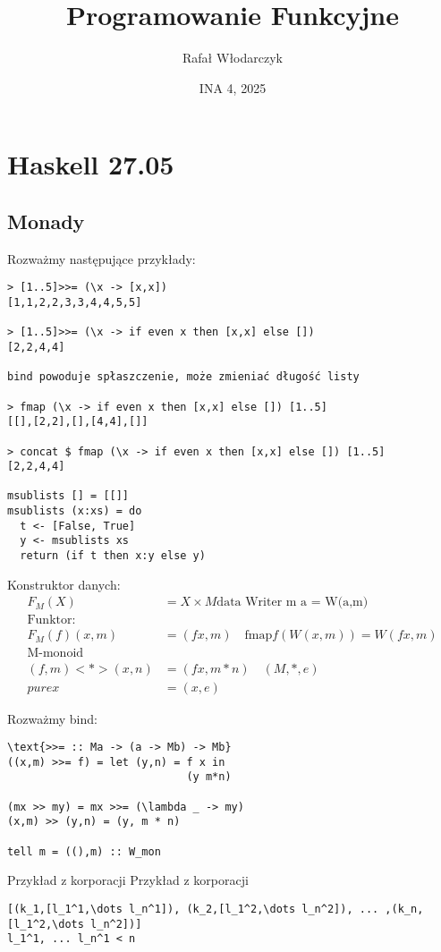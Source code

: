 \documentclass{article}
\title{Programowanie Funkcyjne}
\author{Rafał Włodarczyk}
\date{INA 4, 2025}
\begin{document}
\maketitle

\tableofcontents

\section{Haskell 27.05}

\subsection{Monady}

Rozważmy następujące przykłady:
\begin{verbatim}
> [1..5]>>= (\x -> [x,x])
[1,1,2,2,3,3,4,4,5,5]

> [1..5]>>= (\x -> if even x then [x,x] else [])
[2,2,4,4]

bind powoduje spłaszczenie, może zmieniać długość listy

> fmap (\x -> if even x then [x,x] else []) [1..5]
[[],[2,2],[],[4,4],[]]

> concat $ fmap (\x -> if even x then [x,x] else []) [1..5]
[2,2,4,4]

msublists [] = [[]]
msublists (x:xs) = do
  t <- [False, True]
  y <- msublists xs
  return (if t then x:y else y)
\end{verbatim}

Konstruktor danych:
\begin{align}
    F_M(X) &= X \times M \text{data Writer m a = W(a,m)}\\
    \text{Funktor:}\\
    F_M(f) (x,m) &= (fx, m) \quad \text{fmap} f(W(x,m)) = W(fx,m)\\
    \text{M-monoid}\\
    (f,m) <*> (x,n) &= (fx, m * n) \quad (M,*,e)\\
    pure x &= (x,e)
\end{align}

Rozważmy bind:
\begin{verbatim}
\text{>>= :: Ma -> (a -> Mb) -> Mb}
((x,m) >>= f) = let (y,n) = f x in
                            (y m*n) 

(mx >> my) = mx >>= (\lambda _ -> my)
(x,m) >> (y,n) = (y, m * n)

tell m = ((),m) :: W_mon
\end{verbatim}
Przykład z korporacji
Przykład z korporacji
\begin{verbatim}
[(k_1,[l_1^1,\dots l_n^1]), (k_2,[l_1^2,\dots l_n^2]), ... ,(k_n,[l_1^2,\dots l_n^2])]
l_1^1, ... l_n^1 < n
\end{verbatim}
\end{document}
